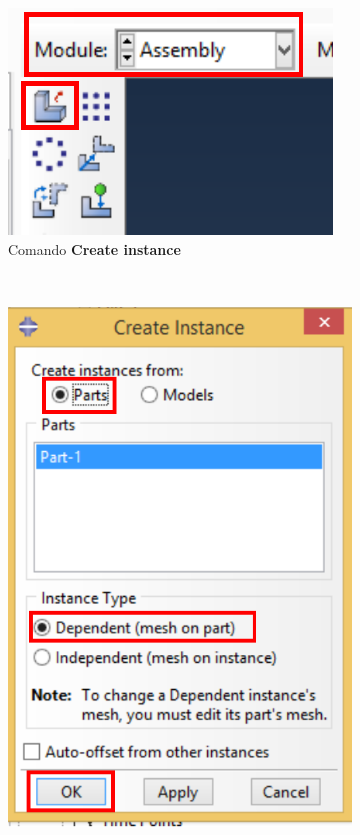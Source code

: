 \begin{figure}[H]
  \centering
  \begin{subfigure}[H]{0.25\textwidth}
    \includegraphics[width=\textwidth]{./body/images/imagen22.pdf}
    \caption{Comando \textbf{Create instance}}
    \label{figu22}
  \end{subfigure}%
  ~ %
  \begin{subfigure}{0.42\textwidth}
    \includegraphics[width=\textwidth]{./body/images/imagen23.pdf}

\end{subfigure}
\end{figure}

